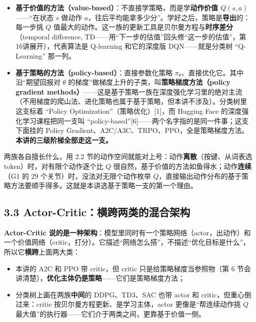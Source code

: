 \documentclass[
  chinese,
]{ctexart}
\providecommand{\tightlist}{%
  \setlength{\itemsep}{0pt}\setlength{\parskip}{0pt}}
\begin{document}
\begin{itemize}
\tightlist
\item
  \textbf{基于价值的方法（value-based）}：不直接学策略，而是学\textbf{动作价值
  \(Q(s,a)\)}------``在状态 \(s\) 做动作
  \(a\)，往后平均能拿多少分''。学好之后，策略是\textbf{导出}的：每一步挑
  \(Q\)
  值最大的动作。这一族的更新工具是贝尔曼方程与\textbf{时序差分}（temporal
  difference,
  TD------用``下一步的估值''回头修``这一步的估值''，第16讲展开），代表算法是
  Q-learning 和它的深度版 DQN------就是分类树 ``Q-Learning'' 那一列。
\item
  \textbf{基于策略的方法（policy-based）}：直接参数化策略
  \(\pi_\theta\)、直接优化它。其中沿``期望回报对 \(\theta\)
  的梯度''做梯度上升的子类，叫\textbf{策略梯度方法（policy gradient
  methods）}------这是基于策略一族在深度强化学习里的绝对主流（不用梯度的爬山法、进化策略也属于基于策略，但本讲不涉及）。分类树里这支标着
  ``Policy Optimization''（策略优化）{[}1{]}，而 Hugging Face
  的深度强化学习课程把同一支叫
  ``policy-based''{[}6{]}------两个名字指的是同一件事；这支下面挂的
  Policy
  Gradient、A2C/A3C、TRPO、PPO，全是策略梯度方法。\textbf{本讲的三级阶梯全部走这一支。}
\end{itemize}

两族各自擅长什么，用 2.2
节的动作空间就能对上号：动作\textbf{离散}（按键、从词表选
token）时，对有限个动作逐个比 \(Q\)
很自然，基于价值的方法如鱼得水；动作\textbf{连续}（G1 的 29
个关节）时，没法对无限个动作枚举
\(Q\)，直接输出动作分布的基于策略方法要顺手得多。这就是本讲选基于策略一支的第一个理由。

\subsection{3.3
Actor-Critic：横跨两类的混合架构}\label{actor-criticux6a2aux8de8ux4e24ux7c7bux7684ux6df7ux5408ux67b6ux6784}

\textbf{Actor-Critic
说的是一种架构}：模型里同时有一个策略网络（actor，出动作）和一个价值网络（critic，打分）。它描述``网络怎么搭''，不描述``优化目标是什么''，所以它\textbf{横跨}上面两大类：

\begin{itemize}
\tightlist
\item
  本讲的 A2C 和 PPO 带 critic，但 critic 只是给策略梯度当参照物（第 6
  节会讲清楚），\textbf{优化主体仍是策略}------它们是策略梯度方法；
\item
  分类树上画在两族\textbf{中间}的 DDPG、TD3、SAC 也带 actor 和
  critic，但重心倒过来：critic 按贝尔曼方程更新、是学习主体，actor
  更像是``帮连续动作挑 \(Q\)
  最大值''的执行器------它们介于两类之间，更靠基于价值一侧。
\end{itemize}
\end{document}
